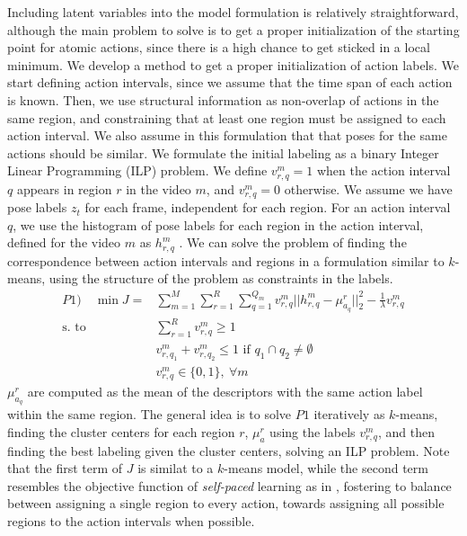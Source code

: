 Including latent variables into the model formulation is relatively straightforward, although the main problem to solve is to get a proper initialization of the starting point for atomic actions, since there is a high chance to get sticked in a local minimum. We develop a method to get a proper initialization of action labels. We start defining action intervals, since we assume that the time span of each action is known. Then, we use structural information as non-overlap of actions in the same region, and constraining that at least one region must be assigned to each action interval. We also assume in this formulation that that poses for the same actions should be similar. We formulate the initial labeling as a binary Integer Linear Programming (ILP) problem. We define $v_{r,q}^m=1$ when the action interval $q$ appears in region $r$ in the video $m$, and $v_{r,q}^m=0$ otherwise. We assume we have pose labels $z_t$ for each frame, independent for each region. For an action interval $q$, we use the histogram of pose labels for each region in the action interval, defined for the video $m$ as $h_{r,q}^m$ . We can solve the problem of finding the correspondence between action intervals and regions in a formulation similar to $k$-means, using the structure of the problem as constraints in the labels. 
\begin{equation}
\begin{split}
P1) \quad \min J= &\sum_{m=1}^M  \sum_{r=1}^R \sum_{q=1}^{Q_m}  v_{r,q}^m || h_{r,q}^m - \mu_{a_q}^r||_2^2 -\frac{1}{\lambda} v_{r,q}^m\\ 
 \text{s. to} 
\quad 
& \sum_{r=1}^R v_{r,q}^m \ge 1 \\ 
& v_{r,q_1}^m + v_{r,q_2}^m \le 1 \text{ if } q_1\cap q_2 \neq \emptyset \\  
& v_{r,q}^m \in \{0,1\},~\forall m
\end{split}
\end{equation}
$\mu_{a_q}^r$ are computed as the mean of the descriptors with the same action label within the same region. The general idea is to solve $P1$ iteratively as $k$-means,  finding the cluster centers for each region $r$, $\mu_{a}^r$ using the labels $v_{r,q}^m$, and then finding the best labeling given the cluster centers, solving an ILP problem. Note that the first term of $J$ is similat to a $k$-means model, while the second term resembles the objective function of \emph{self-paced} learning as in \cite{Kumar2010}, fostering to balance between assigning a single region to every action, towards assigning all possible regions to the action intervals when possible.  

